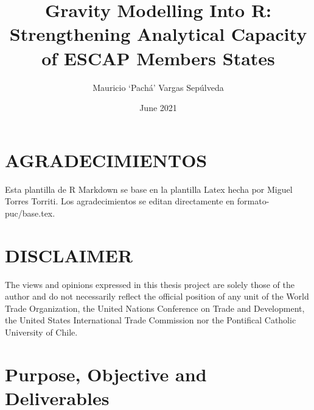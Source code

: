 \documentclass[12pt,reqno,oneside,pdftex]{formato-puc/puctesis} %
\begin{document}
\title{Gravity Modelling Into R: Strengthening Analytical Capacity of
ESCAP Members States}
\author{Mauricio `Pachá' Vargas Sepúlveda}

\date         {June 2021}
\dedication   {To my family, friends, and all the valuable people from
PUC.}

\PageNumbersFootCentered
{}
\maketitle

\chapter*{AGRADECIMIENTOS}
Esta plantilla de R Markdown se base en la plantilla Latex hecha por
Miguel Torres Torriti. Los agradecimientos se editan directamente en formato-puc/base.tex.
\par

\cleardoublepage
\tableofcontents
\listoffigures          
\listoftables           
\cleardoublepage

\chapter*{DISCLAIMER}

The views and opinions expressed in this thesis project are solely those of the author and do not necessarily reflect the official position of any unit of the World Trade Organization, the United Nations Conference on Trade and Development, the United States International Trade Commission nor the Pontifical Catholic University of Chile.

\cleardoublepage %

\NoChapterPageNumber           %

\chapter{Purpose, Objective and Deliverables}
\end{document}
